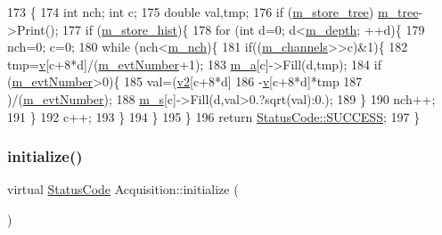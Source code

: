 \begin{DoxyCode}
173                                    \{
174   \textcolor{keywordtype}{int} nch; \textcolor{keywordtype}{int} c;
175   \textcolor{keywordtype}{double} val,tmp;
176   \textcolor{keywordflow}{if} (\hyperlink{classAcquisition_aca2143e9135e25554e58327475a767c5}{m\_store\_tree}) \hyperlink{classAcquisition_aa88a923232e8b7e08f5c1b5411497fc5}{m\_tree}->Print();
177   \textcolor{keywordflow}{if} (\hyperlink{classAcquisition_a08f70edd83751dbdab4c8190dc4b9188}{m\_store\_hist})\{
178     \textcolor{keywordflow}{for} (\textcolor{keywordtype}{int} d=0; d<\hyperlink{classAcquisition_a26628424533a2dd74d24712a14637a72}{m\_depth}; ++d)\{
179       nch=0; c=0;
180       \textcolor{keywordflow}{while} (nch<\hyperlink{classAcquisition_a1860c7a03a65ea7a778d30dd4a40e1e1}{m\_nch})\{
181         \textcolor{keywordflow}{if}((\hyperlink{classAcquisition_aedc8b29f322ef00540797fbd0d5112d1}{m\_channels}>>c)&1)\{
182           tmp=\hyperlink{classAcquisition_ac855680c9bb5f8f14d505d5f41f1a076}{v}[c+8*d]/(\hyperlink{classAcquisition_a32a70daa3f653eae5eafc46dbd0e11a6}{m\_evtNumber}+1);
183           \hyperlink{classAcquisition_aedfd2a4842b08fdf85176bf672030430}{m\_a}[c]->Fill(d,tmp);
184           \textcolor{keywordflow}{if} (\hyperlink{classAcquisition_a32a70daa3f653eae5eafc46dbd0e11a6}{m\_evtNumber}>0)\{
185             val=(\hyperlink{classAcquisition_a8d2cd605d4982223356a14423d735c84}{v2}[c+8*d]
186                  -\hyperlink{classAcquisition_ac855680c9bb5f8f14d505d5f41f1a076}{v}[c+8*d]*tmp
187                  )/(\hyperlink{classAcquisition_a32a70daa3f653eae5eafc46dbd0e11a6}{m\_evtNumber});
188             \hyperlink{classAcquisition_ad7f531c3d3fc58d1a2a5eab954db0ca7}{m\_s}[c]->Fill(d,val>0.?sqrt(val):0.);
189           \}
190           nch++;
191         \}
192         c++;
193       \}
194     \}
195   \}
196   \textcolor{keywordflow}{return} \hyperlink{classStatusCode_a6f565cbeadc76d14c72f047e5e85eb4badd0da38d3ba0d922efd1f4619bc37ad8}{StatusCode::SUCCESS};
197 \}
\end{DoxyCode}
\mbox{\label{classAcquisition_aa73eec1ec46deae89bd3c25551bad86e}} 
\subsubsection{\texorpdfstring{initialize()}{initialize()}\hspace{0.1cm}{\footnotesize\ttfamily [1/2]}}
{\footnotesize\ttfamily virtual \hyperlink{classStatusCode}{Status\+Code} Acquisition\+::initialize (\begin{DoxyParamCaption}{ }\end{DoxyParamCaption})\hspace{0.3cm}{\ttfamily [virtual]}}

